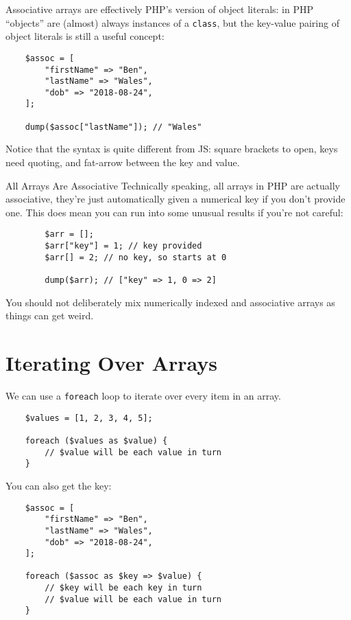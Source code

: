 Associative arrays are effectively PHP's version of object literals: in PHP ``objects'' are (almost) always instances of a \texttt{class}, but the key-value pairing of object literals is still a useful concept:

\begin{verbatim}
    $assoc = [
        "firstName" => "Ben",
        "lastName" => "Wales",
        "dob" => "2018-08-24",
    ];

    dump($assoc["lastName"]); // "Wales"
\end{verbatim}

Notice that the syntax is quite different from JS: square brackets to open, keys need quoting, and fat-arrow between the key and value.

\pagebreak

\begin{infobox}{All Arrays Are Associative}
    Technically speaking, all arrays in PHP are actually associative, they're just automatically given a numerical key if you don't provide one. This does mean you can run into some unusual results if you're not careful:

    \begin{verbatim}
        $arr = [];
        $arr["key"] = 1; // key provided
        $arr[] = 2; // no key, so starts at 0

        dump($arr); // ["key" => 1, 0 => 2]
    \end{verbatim}

    You should not deliberately mix numerically indexed and associative arrays as things can get weird.
\end{infobox}


\section{Iterating Over Arrays}

We can use a \texttt{foreach} loop to iterate over every item in an array.

\begin{verbatim}
    $values = [1, 2, 3, 4, 5];

    foreach ($values as $value) {
        // $value will be each value in turn
    }
\end{verbatim}

You can also get the key:

\begin{verbatim}
    $assoc = [
        "firstName" => "Ben",
        "lastName" => "Wales",
        "dob" => "2018-08-24",
    ];

    foreach ($assoc as $key => $value) {
        // $key will be each key in turn
        // $value will be each value in turn
    }
\end{verbatim}

